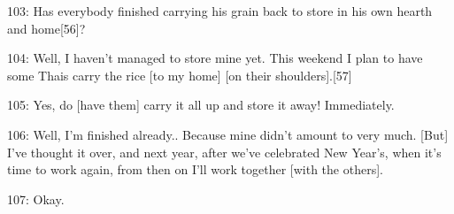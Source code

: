 \leftskip=0pt
103: Has everybody finished carrying his grain back to store in his own hearth
and home[56]?

104: Well, I haven't managed to store mine yet. This weekend I plan to have some
Thais carry the rice [to my home] [on their shoulders].[57]

105: Yes, do [have them] carry it all up and store it away! Immediately.

106: Well, I'm finished already.. Because mine didn't amount to very much. [But]
I've thought it over, and next year, after we've celebrated New Year's, when it's
time to work again, from then on I'll work together [with the others].

107: Okay.

